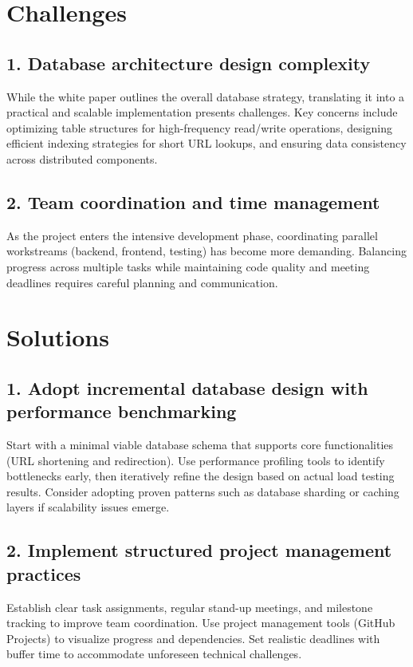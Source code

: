 \documentclass[11pt,a4paper]{article}
\begin{document}
\section{Challenges}

\begin{adjustwidth}{1.5em}{}
\subsection{1. Database architecture design complexity}

While the white paper outlines the overall database strategy, translating it into a practical and scalable implementation presents challenges. Key concerns include optimizing table structures for high-frequency read/write operations, designing efficient indexing strategies for short URL lookups, and ensuring data consistency across distributed components.

\subsection{2. Team coordination and time management}

As the project enters the intensive development phase, coordinating parallel workstreams (backend, frontend, testing) has become more demanding. Balancing progress across multiple tasks while maintaining code quality and meeting deadlines requires careful planning and communication.
\end{adjustwidth}

\section{Solutions}

\begin{adjustwidth}{1.5em}{}
\subsection{1. Adopt incremental database design with performance benchmarking}

Start with a minimal viable database schema that supports core functionalities (URL shortening and redirection). Use performance profiling tools to identify bottlenecks early, then iteratively refine the design based on actual load testing results. Consider adopting proven patterns such as database sharding or caching layers if scalability issues emerge.

\subsection{2. Implement structured project management practices}

Establish clear task assignments, regular stand-up meetings, and milestone tracking to improve team coordination. Use project management tools (GitHub Projects) to visualize progress and dependencies. Set realistic deadlines with buffer time to accommodate unforeseen technical challenges.
\end{adjustwidth}
\end{document}
